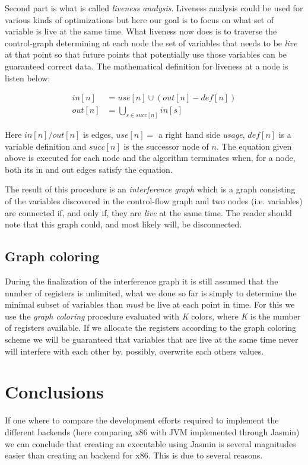\documentclass[11pt]{amsart}
\begin{document}
Second part is what is called \textit{liveness analysis}. Liveness analysis could be used for various kinds of optimizations but here our goal is to focus on what set of variable is live at the same time. What liveness now does is to traverse the control-graph determining at each node the set of variables that needs to be \textit{live} at that point so that future points that potentially use those variables can be guaranteed correct data. The mathematical definition for liveness at a node is listen below:

\begin{align*}
in[n] &= use[n] \cup (out[n] - def[n]) \\
out[n] &= \bigcup_{s \in succ[n]} in[s]
\end{align*}

Here $in[n]/out[n]$ is edges, $use[n] =$ a right hand side \textit{usage}, $def[n]$ is a variable definition and $succ[n]$ is the successor node of $n$. The equation given above is executed for each node and the algorithm terminates when, for a node, both its in and out edges satisfy the equation. 

The result of this procedure is an \textit{interference graph} which is a graph consisting of the variables discovered in the control-flow graph and two nodes (i.e. variables) are connected if, and only if, they are \textit{live} at the same time. The reader should note that this graph could, and most likely will, be disconnected.

\subsection{Graph coloring}
During the finalization of the interference graph it is still assumed that the number of registers is unlimited, what we done so far is simply to determine the minimal subset of variables than \textit{must} be live at each point in time. For this we use the \textit{graph coloring} procedure evaluated with \textit{K} colors, where \textit{K} is the number of registers available. If we allocate the registers according to the graph coloring scheme we will be guaranteed that variables that are live at the same time never will interfere with each other by, possibly, overwrite each others values.

\section{Conclusions}
If one where to compare the development efforts required to implement the different backends (here comparing x86 with JVM implemented through Jasmin) we can conclude that creating an executable using Jasmin is several magnitudes easier than creating an backend for x86. This is due to several reasons.
\end{document}
